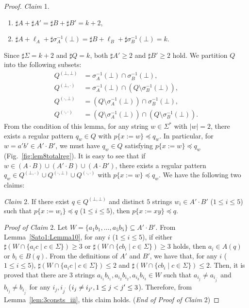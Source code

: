 \begin{proof}
\smallskip

\noindent
\textit{Claim} 1. 
\begin{enumerate}
  \item[(i)] $\sharp A + \sharp A' = \sharp B + \sharp B' = k + 2$,
  \item[(ii)] $\sharp A + \ell_{A} + \sharp \sigma_{A}^{-1}(\bot) = \sharp B + \ell_{B} + \sharp \sigma_{B}^{-1}(\bot) = k$.
\end{enumerate}

\smallskip

Since $\sharp \Sigma = k + 2$ and $\sharp Q = k$, {\color{black} both} $\sharp A' \geq 2$ and $\sharp B' \geq 2$ hold.
We partition $Q$ into the following subsets:
\begin{align*}
    Q^{(\bot,\bot)} & = \sigma_{A}^{-1}(\bot) \cap \sigma_{B}^{-1}(\bot),\\
    Q^{(\bot,\cdot)} & = \sigma_{A}^{-1}(\bot) \cap (Q\setminus \sigma_{B}^{-1}(\bot)),\\
    Q^{(\cdot,\bot)} & = (Q\setminus \sigma_{A}^{-1}(\bot)) \cap \sigma_{B}^{-1}(\bot),\\
    Q^{(\cdot,\cdot)} & = (Q\setminus \sigma_{A}^{-1}(\bot)) \cap (Q\setminus \sigma_{B}^{-1}(\bot)).
\end{align*}
From the condition of this lemma, for any string $w \in \Sigma^{\ast}$ with $|w|=2$, there exists a regular pattern $q_{w} \in Q$ {\color{black}with} $p \{ x:=w \} \preceq q_{w}$.
In particular, for $w=a'b'\in A'\cdot B'$, we must have $q_{w} \in Q$ {\color{black}satisfying} $p \{ x:=w \} \preceq q_{w}$ (Fig.~\ref{fig:lem8totalreg}).
It is easy to see that if $w \in (A\cdot B) \cup (A'\cdot B) \cup (A\cdot B')$, there exists a regular pattern $q_{w} \in Q^{(\bot,\cdot)} \cup Q^{(\cdot,\bot)} \cup Q^{(\cdot,\cdot)}$ {\color{black}with} $p \{ x:=w \} \preceq q_{w}$.
We have the following two claims:
\smallskip

\noindent
\textit{Claim} 2. If there exist $q \in Q^{(\bot,\bot)}$ and distinct $5$ strings $w_{i} \in A'\cdot B'$ ($1\leq i\leq 5$) such  that $p \{ x:=w_{i} \} \preceq q$ ($1\leq i\leq 5$),  then $p \{ x:=xy \} \preceq q$.

\smallskip

\noindent
\textit{Proof of Claim} 2.
Let $W = \{a_{1}b_{1},\ldots,a_{5}b_{5}\} \subseteq A'\cdot B'$.
{\color{black}From Lemma~\ref{Sato1:Lemma10}, for any $i$ ($1\leq i\leq 5$), if either $\sharp (W\cap \{a_{i}c \mid c \in \Sigma\})\geq 3$ or $\sharp (W \cap \{cb_{i} \mid c \in \Sigma\}) \geq 3$ holds, then $a_{i}\in A(q)$ or $b_{i}\in B(q)$.
From the definitions of $A'$ and $B'$, {\color{black}we have} that,  
for any $i$ ($1\leq i\leq 5$), $\sharp (W \cap \{a_{i}c \mid c \in \Sigma\}) \leq 2$ and $\sharp (W \cap \{cb_{i} \mid c \in \Sigma\}) \leq 2$.}
{\color{black} Then, it is proved} that there are $3$ strings $a_{i_{1}}b_{i_{1}},a_{i_{2}}b_{i_{2}},a_{i_{3}}b_{i_{3}}\in W$ such that $a_{i_{j}} \not= a_{i_{j^{\prime}}}$ and $b_{i_{j}} \not= b_{i_{j^{\prime}}}$ for any $i_{j},i_{j^{\prime}}$ ($i_{j}\not= i_{j^{\prime}}, {\color{black}1\leq j<j^{\prime}\leq 3}$).
Therefore, from Lemma~\ref{lem:3consts_iii}, this claim holds. (\textit{End of Proof of Claim} 2)


\end{proof}
